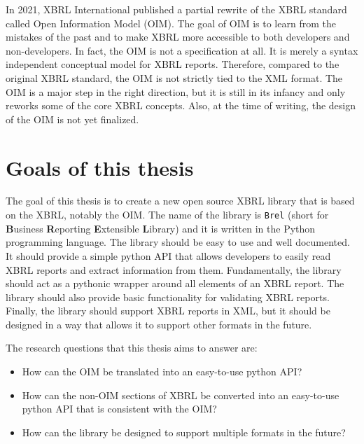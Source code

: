In 2021, XBRL International published a partial rewrite of the XBRL standard called Open Information Model (OIM)\cite{oim}.
The goal of OIM is to learn from the mistakes of the past and to make XBRL more accessible to both developers and non-developers.
In fact, the OIM is not a specification at all.
It is merely a syntax independent conceptual model for XBRL reports.
Therefore, compared to the original XBRL standard, the OIM is not strictly tied to the XML format.
The OIM is a major step in the right direction, but it is still in its infancy and only reworks some of the core XBRL concepts.
Also, at the time of writing, the design of the OIM is not yet finalized.

\section{Goals of this thesis}

The goal of this thesis is to create a new open source XBRL library that is based on the XBRL, notably the OIM.
The name of the library is \texttt{Brel} (short for \textbf{B}usiness \textbf{R}eporting \textbf{E}xtensible \textbf{L}ibrary) and it is written in the Python programming language.
The library should be easy to use and well documented.
It should provide a simple python API that allows developers to easily read XBRL reports and extract information from them.
Fundamentally, the library should act as a pythonic wrapper around all elements of an XBRL report.
The library should also provide basic functionality for validating XBRL reports.
Finally, the library should support XBRL reports in XML, but it should be designed in a way that allows it to support other formats in the future.

The research questions that this thesis aims to answer are:

\begin{itemize}
    \item How can the OIM be translated into an easy-to-use python API?\label{itm:research_question_1}
    \item How can the non-OIM sections of XBRL be converted into an easy-to-use python API that is consistent with the OIM?\label{itm:research_question_2}
    \item How can the library be designed to support multiple formats in the future?\label{itm:research_question_3}
\end{itemize}

